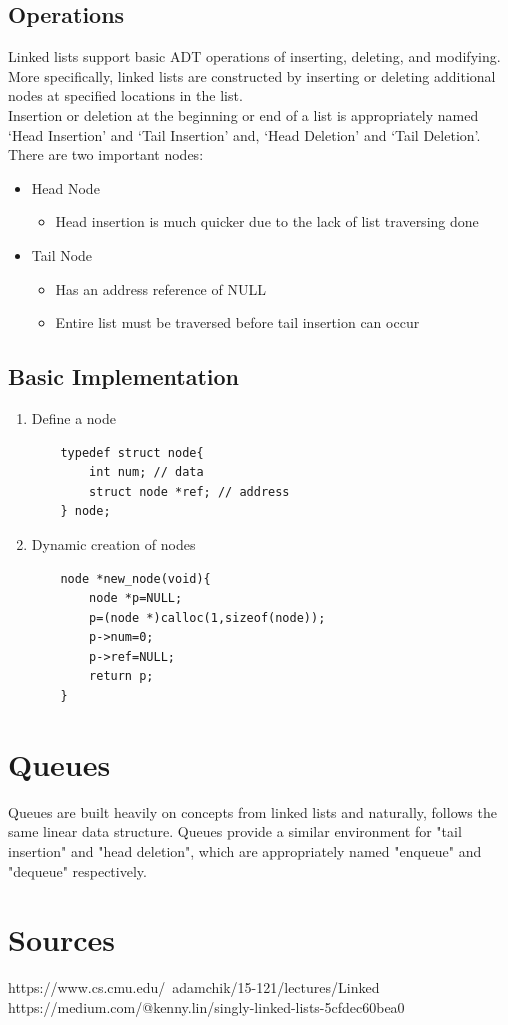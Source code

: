 \documentclass[hidelinks,11pt]{article}
\begin{document}
\subsection{Operations}
Linked lists support basic ADT operations of inserting, deleting, and modifying. \\
More specifically, linked lists are constructed by inserting or deleting additional nodes at specified locations in the list. \\
Insertion or deletion at the beginning or end of a list is appropriately named `Head Insertion' and `Tail Insertion' and, `Head Deletion' and `Tail Deletion'.
\\[0.5\baselineskip]
There are two important nodes:
\begin{itemize}
    \item Head Node
    \begin{itemize}
        \item Head insertion is much quicker due to the lack of list traversing done
    \end{itemize}
    \item Tail Node
    \begin{itemize}
        \item Has an address reference of NULL
        \item Entire list must be traversed before tail insertion can occur
    \end{itemize}
\end{itemize}

\subsection{Basic Implementation}
\begin{enumerate}
    \item Define a node
    \begin{lstlisting}
    typedef struct node{
        int num; // data
        struct node *ref; // address
    } node;
    \end{lstlisting}
    \item Dynamic creation of nodes
    \begin{lstlisting}
    node *new_node(void){
        node *p=NULL;
        p=(node *)calloc(1,sizeof(node));
        p->num=0;
        p->ref=NULL;
        return p;
    }
    \end{lstlisting}
\end{enumerate}

\section{Queues}
Queues are built heavily on concepts from linked lists and naturally, follows the same linear data structure. Queues provide a similar environment for "tail insertion" and "head deletion", which are appropriately named "enqueue" and "dequeue" respectively.


\section{Sources}
https://www.cs.cmu.edu/~adamchik/15-121/lectures/Linked%
\\
https://medium.com/@kenny.lin/singly-linked-lists-5cfdec60bea0
\end{document}

